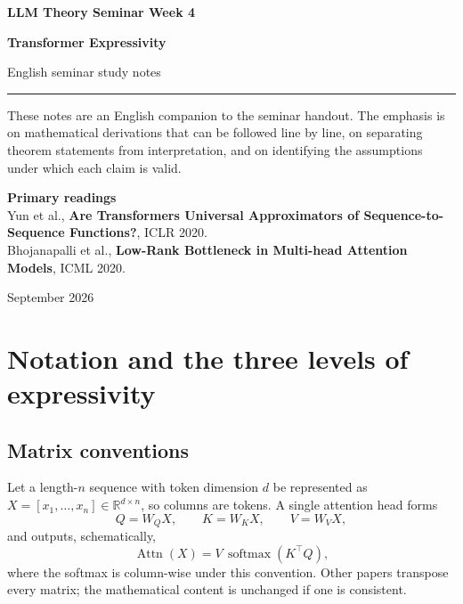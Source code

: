 \documentclass[11pt,a4paper,oneside,openany]{memoir}
\newcommand{\R}{\mathbb{R}}
\theoremstyle{definition}
\begin{document}
\begin{titlingpage}
\thispagestyle{empty}
\vspace*{1.2cm}
{\small\bfseries LLM Theory Seminar \hfill Week 4\par}
\vspace{1.4cm}
{\HUGE\bfseries Transformer Expressivity\par}
\vspace{0.55cm}
{\large English seminar study notes\par}
\vspace{0.9cm}
\rule{\textwidth}{0.7pt}
\vspace{1.1cm}
\begin{minipage}{0.86\textwidth}
\small
These notes are an English companion to the seminar handout.  The emphasis is on
mathematical derivations that can be followed line by line, on separating theorem
statements from interpretation, and on identifying the assumptions under which each
claim is valid.
\end{minipage}
\vfill
{\small\textbf{Primary readings}\\[0.25em]
Yun et al., \textbf{Are Transformers Universal Approximators of Sequence-to-Sequence Functions?}, ICLR 2020.\\Bhojanapalli et al., \textbf{Low-Rank Bottleneck in Multi-head Attention Models}, ICML 2020.
\par}
\vspace{0.8cm}
{\small September 2026\par}
\end{titlingpage}
\tableofcontents*
\clearpage

\chapter{Notation and the three levels of expressivity}
\section{Matrix conventions}
Let a length-$n$ sequence with token dimension $d$ be represented as $X=[x_1,\ldots,x_n]\in\R^{d\times n}$, so columns are tokens.  A single attention head forms
\[
Q=W_QX,\qquad K=W_KX,\qquad V=W_VX,
\]
and outputs, schematically,
\[
\operatorname{Attn}(X)=V\,\operatorname{softmax}(K^\top Q),
\]
where the softmax is column-wise under this convention.  Other papers transpose every matrix; the mathematical content is unchanged if one is consistent.
\end{document}
